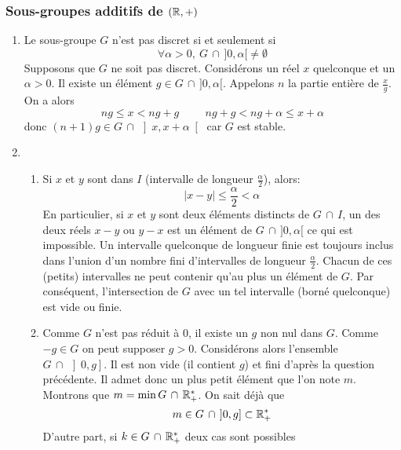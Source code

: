 \subsubsection*{Sous-groupes additifs de $(\mathbb{R},+)$}
\begin{enumerate}
  \item Le sous-groupe $G$ n'est pas discret si et seulement si
  \begin{displaymath}
 \forall \alpha >0,\: G \,\cap\, ]0,\alpha[ \neq \emptyset
\end{displaymath}
 Supposons que $G$ ne soit pas discret. Consid{\'e}rons un r{\'e}el $x$ quelconque et un $\alpha>0$. Il existe un élément $g \in G \,\cap\, ]0,\alpha[$. Appelons $n$ la partie enti{\`e}re de $\frac{x}{g}$. On a alors
\[
  ng \leq x < ng+g \hspace{1cm}
  ng+g<ng+\alpha \leq x+ \alpha
\]
  donc $(n+1)g\in G \,\cap\, \left]x,x+\alpha \right[$ car $G$ est stable.
  \item
 \begin{enumerate}
 \item Si $x$ et $y$ sont dans $I$ (intervalle de longueur $\frac{\alpha}{2}$), alors:
\begin{displaymath}
 |x-y|\leq \frac{\alpha}{2}<\alpha
\end{displaymath}
En particulier, si $x$ et $y$ sont deux {\'e}l{\'e}ments distincts de $G\,\cap\, I$, un des deux réels $x-y$ ou $y-x$ est un {\'e}l{\'e}ment de $G \,\cap\, ]0,\alpha[$ ce qui est impossible.\newline
Un intervalle quelconque de longueur finie est toujours inclus dans l'union d'un nombre fini d'intervalles de longueur $\frac{\alpha}{2}$. Chacun de ces (petits) intervalles ne peut contenir qu'au plus un élément de $G$. Par cons{\'e}quent, l'intersection de $G$ avec un tel intervalle (borné quelconque) est vide ou finie.
 \item Comme $G$ n'est pas r{\'e}duit {\`a} 0, il existe un $g$ non nul dans $G$. Comme $-g\in G$ on peut supposer $g>0$. 
Consid{\'e}rons alors l'ensemble $G \,\cap\, \left]0,g \right]$.\newline
Il est non vide (il contient $g$) et fini d'apr{\`e}s la question pr{\'e}c{\'e}dente. Il admet donc un plus petit {\'e}l{\'e}ment que l'on note $m$.\newline
Montrons que $m= \min G \,\cap\, \mathbb{R}_+^*$.\newline
On sait d{\'e}j{\`a} que
      \[m \in G \,\cap\, \left]0,g \right] \subset \mathbb{R}_+^*\]
D'autre part, si $k \in G \,\cap\, \mathbb{R}_+^*$ deux cas sont possibles

\end{enumerate}
\end{enumerate}
